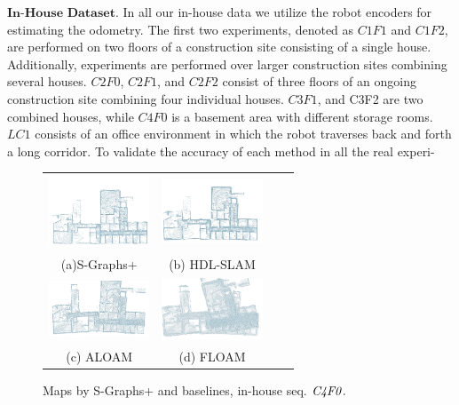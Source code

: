 \documentclass[10pt, letterpaper]{article}
\begin{document}
\begin{multicols*}{2}
$\textbf{In-House Dataset.}$ In all our in-house data we utilize
the robot encoders for estimating the odometry. The first
two experiments, denoted as $\textit{C1F1}$ and $\textit{C1F2}$, are performed
on two floors of a construction site consisting of a single
house. Additionally, experiments are performed over larger
construction sites combining several houses. $\textit{C2F0}$, $\textit{C2F1}$,
and $\textit{C2F2}$ consist of three floors of an ongoing construction
site combining four individual houses. $\textit{C3F1}$, and C3F2 are
two combined houses, while $\textit{C4F0}$ is a basement area with
different storage rooms. $\textit{LC1}$ consists of an office environment
in which the robot traverses back and forth a long corridor.
To validate the accuracy of each method in all the real experi-
\begin{figure}[H]
    \centering
    \begin{tabular}{cccc}
    \includegraphics[width=3cm]{images/image_a.png} &
    \includegraphics[width=3cm]{images/image_b.png} \\
    (a)S-Graphs+   & (b)  HDL-SLAM\\
    \includegraphics[width=3cm]{images/image_c.png} &
    \includegraphics[width=3cm]{images/image_d.png}\\
    
     (c) ALOAM  & (d)  FLOAM\\ %
    
    
    \end{tabular}
    \caption{Maps by S-Graphs+ and baselines, in-house seq. $\it{C4F0.}$}
    \label{fig:my_label}
\end{figure}

{\small


}
\end{multicols*}
\end{document}
